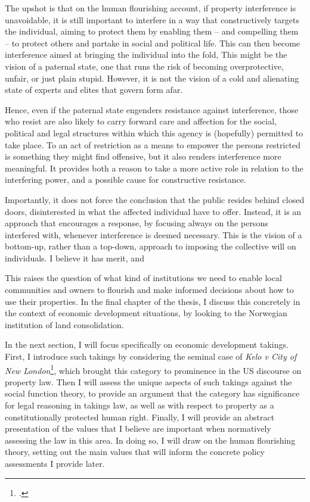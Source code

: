 {The upshot is that on the human flourishing account, if property interference is unavoidable, it is still important to interfere in a way that constructively targets the individual, aiming to protect them by enabling them -- and compelling them -- to protect others and partake in social and political life. This can then become interference aimed at bringing the individual into the fold,  This might be the vision of a paternal state, one that runs the risk of becoming overprotective, unfair, or just plain stupid. However, it is 
not the vision of a cold and alienating state of experts and elites that govern form afar.

Hence, even if the paternal state engenders resistance against interference, those who resist are also likely to carry forward care and affection for the social, political and legal structures within which this agency is (hopefully) permitted to take place. To  an act of restriction as a means to empower the persons restricted is something they might find offensive, but it also renders interference more meaningful. It provides both a reason to take a more active role in relation to the interfering power, and a possible cause for constructive resistance. 

Importantly, it does not force the conclusion that the public resides behind closed doors, disinterested in what the affected individual have to offer. Instead, it is an approach that encourages a response, by focusing always on the persons interfered with, whenever interference is deemed necessary. This is the vision of a bottom-up, rather than a top-down, approach to imposing the collective will on individuals. I believe it has merit, and 
}

This raises the question of what kind of institutions we need to enable local communities and owners to  flourish and make informed decisions about how to use their properties. In the final chapter of the thesis, I discuss this concretely in the context of economic development situations, by looking to the Norwegian institution of land consolidation.

In the next section, I will focus specifically on economic development takings. First, I introduce such takings by considering the seminal case of {\it Kelo v City of New London}\footcite{kelo05}, which brought this category to prominence in the US discourse on property law. Then I will assess the unique aspects of such takings against the social function theory, to provide an argument that the category has significance for legal reasoning in takings law, as well as with respect to property as a constitutionally protected human right. Finally, I will provide an abstract presentation of the values that I believe are important when normatively assessing the law in this area. In doing so, I will draw on the human flourishing theory, setting out the main values that will inform the concrete policy assessments I provide later. 

